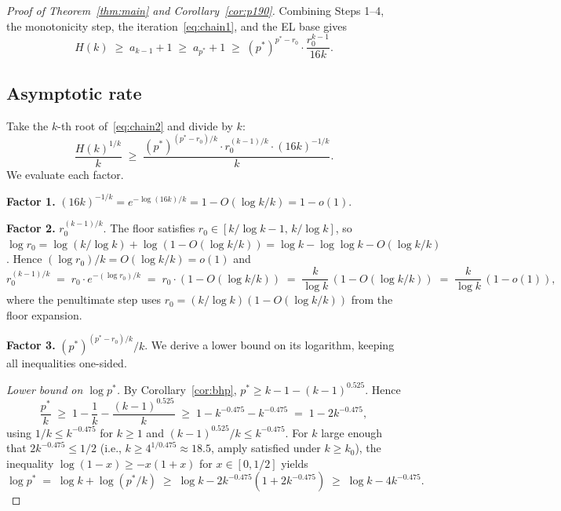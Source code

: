 \documentclass[11pt,reqno,a4paper]{amsart}
\theoremstyle{plain}
\theoremstyle{definition}
\theoremstyle{remark}
\numberwithin{equation}{section}
\begin{document}
\begin{proof}[Proof of Theorem~\ref{thm:main} and Corollary~\ref{cor:p190}]
\smallskip
\noindent Combining Steps 1--4, the monotonicity step, the
iteration~\eqref{eq:chain1}, and the EL base gives
\begin{equation}
H(k)\;\ge\;a_{k-1}+1\;\ge\;a_{p^{*}}+1\;\ge\;(p^{*})^{p^{*}-r_{0}}\cdot
\frac{r_{0}^{k-1}}{16k}.
\label{eq:chain2}
\end{equation}

\subsection{Asymptotic rate}
\label{subsec:asymp}

Take the $k$-th root of~\eqref{eq:chain2} and divide by $k$:
\begin{equation}
\frac{H(k)^{1/k}}{k}\;\ge\;\frac{(p^{*})^{(p^{*}-r_{0})/k}\cdot r_{0}^{(k-1)/k}
\cdot(16k)^{-1/k}}{k}.
\label{eq:chain3}
\end{equation}
We evaluate each factor.

\smallskip
\noindent\textbf{Factor 1.}
$(16k)^{-1/k}=e^{-\log(16k)/k}=1-O(\log k/k)=1-o(1)$.

\smallskip
\noindent\textbf{Factor 2.} $r_{0}^{(k-1)/k}$. The floor satisfies
$r_{0}\in[k/\log k-1,\,k/\log k]$, so
$\log r_{0}=\log(k/\log k)+\log(1-O(\log k/k))=\log k-\log\log k-O(\log k/k)$.
Hence $(\log r_{0})/k=O(\log k/k)=o(1)$ and
\[
r_{0}^{(k-1)/k}\;=\;r_{0}\cdot e^{-(\log r_{0})/k}
\;=\;r_{0}\cdot(1-O(\log k/k))
\;=\;\frac{k}{\log k}\,(1-O(\log k/k))
\;=\;\frac{k}{\log k}\,(1-o(1)),
\]
where the penultimate step uses
$r_{0}=(k/\log k)(1-O(\log k/k))$ from the floor expansion.

\smallskip
\noindent\textbf{Factor 3.} $(p^{*})^{(p^{*}-r_{0})/k}/k$. We derive a
lower bound on its logarithm, keeping all inequalities one-sided.

\emph{Lower bound on $\log p^{*}$.} By Corollary~\ref{cor:bhp},
$p^{*}\ge k-1-(k-1)^{0.525}$. Hence
\[
\frac{p^{*}}{k}\;\ge\;1-\frac{1}{k}-\frac{(k-1)^{0.525}}{k}
\;\ge\;1-k^{-0.475}-k^{-0.475}\;=\;1-2k^{-0.475},
\]
using $1/k\le k^{-0.475}$ for $k\ge 1$ and
$(k-1)^{0.525}/k\le k^{-0.475}$. For $k$ large enough that
$2k^{-0.475}\le 1/2$ (i.e., $k\ge 4^{1/0.475}\approx 18.5$, amply
satisfied under $k\ge k_{0}$), the inequality $\log(1-x)\ge -x(1+x)$
for $x\in[0,1/2]$ yields
\begin{equation}
\log p^{*}\;=\;\log k+\log(p^{*}/k)
\;\ge\;\log k-2k^{-0.475}(1+2k^{-0.475})
\;\ge\;\log k-4k^{-0.475}.
\label{eq:logpstar}
\end{equation}


\end{proof}
\end{document}
